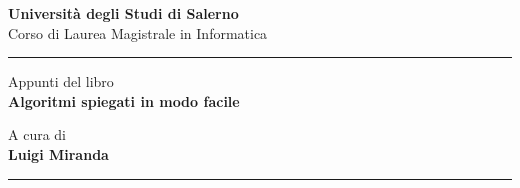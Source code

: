 \begin{titlepage} %
\begin{Large}
 \begin{center}
 \huge{ \bf Università degli Studi di Salerno\\ }
    \vspace{1mm}
	\large{{Corso di Laurea Magistrale in Informatica\\}}
    \vspace{2mm}
    \hrule %

    \vfill
    {{Appunti del libro}}\\
	\vspace{2mm}
	{\huge{\bf Algoritmi spiegati in modo facile}}\\
 \vspace{2mm}
     \small{}
\end{center}
\end{Large}

\vfill
\begin{flushright}
   A cura di\\
    \bf Luigi Miranda
\end{flushright}

\hrule
\vspace{2mm}
\end{titlepage}